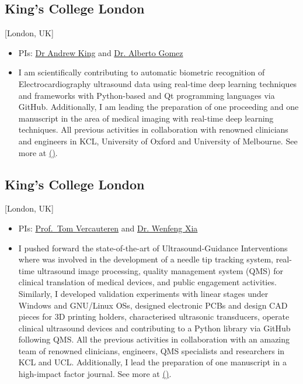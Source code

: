 \documentclass{mycv}
\begin{document}
\subsection{King's College London}[London, UK]
\vspace{1mm}
\begin{positions}
\end{positions}
\begin{itemize}
  \item PIs: \href{http://kclmmag.org/}{Dr Andrew King} and  \href{https://gomezalberto.github.io/}{Dr. Alberto Gomez}
  \item I am scientifically contributing to automatic biometric recognition of Electrocardiography ultrasound data using real-time deep learning techniques and frameworks with Python-based and Qt programming languages via GitHub.
Additionally, I am leading the preparation of one proceeding and one manuscript in the area of medical imaging with real-time deep learning techniques.
All previous activities in collaboration with renowned clinicians and engineers in KCL, University of Oxford and University of Melbourne. 
See more at \href{http://vital.oucru.org/major-partners/kings-college-london/}{(\faExternalLink*)}.
\end{itemize}

\subsection{King's College London}[London, UK]
\vspace{1mm}
\begin{positions}
\end{positions}
\begin{itemize}
  \item PIs: \href{https://cai4cai.ml}{Prof.~Tom Vercauteren} and  \href{https://www.purlkcl.org/}{Dr. Wenfeng Xia} 
  \item I pushed forward the state-of-the-art of Ultrasound-Guidance Interventions
	where was involved in the development of a needle tip tracking system, real-time ultrasound image processing, 
	quality management system (QMS) for clinical translation of medical devices, and public engagement activities.
	Similarly, I developed validation experiments with linear stages under Windows and GNU/Linux OSs,
	designed electronic PCBs and design CAD pieces for 3D printing holders, characterised ultrasonic transducers,
    operate clinical ultrasound devices and contributing to a Python library via GitHub following QMS.
	All the previous activities in collaboration with an amazing 
	team of renowned clinicians, engineers, QMS specialists and researchers in KCL and UCL.
	Additionally, I lead the preparation of one manuscript in a high-impact factor journal.
	See more at \href{https://cai4cai.ml/author/miguel-xochicale/}{(\faExternalLink*)}.
\end{itemize}
\end{document}
